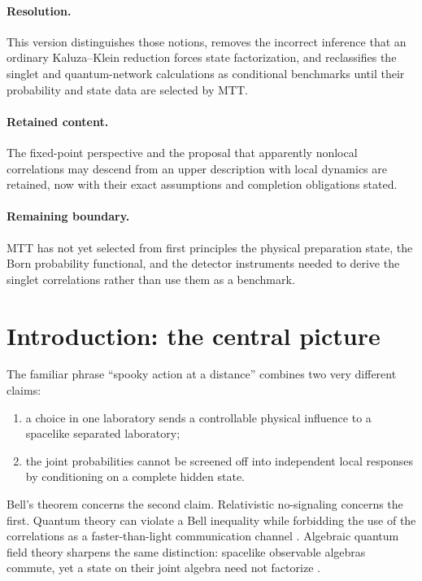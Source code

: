 \documentclass[11pt]{article}
\theoremstyle{remark}
\begin{document}
\paragraph{Resolution.}
This version distinguishes those notions, removes the incorrect inference
that an ordinary Kaluza--Klein reduction forces state factorization, and
reclassifies the singlet and quantum-network calculations as conditional
benchmarks until their probability and state data are selected by MTT.

\paragraph{Retained content.}
The fixed-point perspective and the proposal that apparently nonlocal
correlations may descend from an upper description with local dynamics are
retained, now with their exact assumptions and completion obligations stated.

\paragraph{Remaining boundary.}
MTT has not yet selected from first principles the physical preparation
state, the Born probability functional, and the detector instruments needed
to derive the singlet correlations rather than use them as a benchmark.

\tableofcontents

\section{Introduction: the central picture}

The familiar phrase ``spooky action at a distance'' combines two very
different claims:

\begin{enumerate}[label=(\roman*)]
\item a choice in one laboratory sends a controllable physical influence to a
spacelike separated laboratory;
\item the joint probabilities cannot be screened off into independent local
responses by conditioning on a complete hidden state.
\end{enumerate}

Bell's theorem concerns the second claim.  Relativistic no-signaling concerns
the first.  Quantum theory can violate a Bell inequality while forbidding the
use of the correlations as a faster-than-light communication channel
\cite{Bell1964,CHSH1969}.  Algebraic quantum field theory sharpens the same
distinction: spacelike observable algebras commute, yet a state on their joint
algebra need not factorize \cite{Haag1992,SummersWerner1987}.
\end{document}

